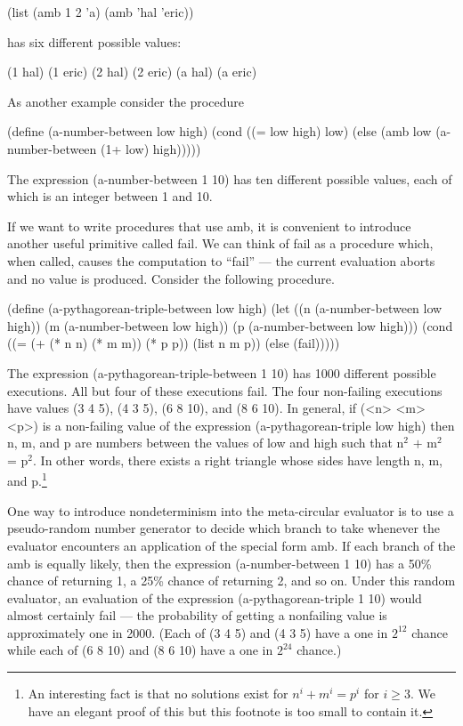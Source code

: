 \beginlisp
(list (amb 1 2 'a) (amb 'hal 'eric))
\endlisp

has six different possible values:

\beginlisp
(1 hal)
(1 eric)
(2 hal)
(2 eric)
(a hal)
(a eric)
\endlisp

As another example consider the procedure

\beginlisp
(define (a-number-between low high)
  (cond ((= low high) low)
        (else (amb low (a-number-between (1+ low) high)))))
\endlisp

The expression {\cf (a-number-between 1 10)}
has ten different possible values, each of which is an integer between
1 and 10.

If we want to write procedures that use {\cf amb}, it is convenient to
introduce another useful  
primitive called {\cf fail}.  We can think of {\cf fail} as a procedure
which, when called, causes the computation to ``fail'' --- the current
evaluation aborts and no value is produced.  Consider the following procedure.

\beginlisp
(define (a-pythagorean-triple-between low high)
  (let ((n (a-number-between low high))
        (m (a-number-between low high))
        (p (a-number-between low high)))
    (cond ((= (+ (* n n) (* m m)) (* p p))
           (list n m p))
          (else (fail)))))
\endlisp

The expression {\cf (a-pythagorean-triple-between 1 10)} has
1000 different possible executions.  All but four of these executions fail.
The four non-failing executions have values {\cf (3 4 5)}, {\cf (4 3 5)}, {\cf (6 8 10)},
and {\cf (8 6 10)}.  In general, if {\cf (<n> <m> <p>)} is a non-failing value
of the expression {\cf (a-pythagorean-triple low high)} then {\cf n},
{\cf m}, and {\cf p} are numbers between the values of {\cf low} and
{\cf high} such that
{\cf n}$^2$ $+$ {\cf m}$^2$ = {\cf p}$^2$.  In other words, there exists a
right triangle whose sides have length {\cf n}, {\cf m}, and {\cf
p}.\footnote{An interesting fact is that no solutions exist for $n^i +
m^i = p^i$ for $i \geq 3$.  We have an elegant proof of this but this
footnote is too small to contain it.}

One way to introduce nondeterminism into the meta-circular evaluator is
to use a pseudo-random number generator to decide which branch to take
whenever the evaluator encounters an 
application of the special form {\cf amb}.  If each branch of the {\cf amb}
is equally likely, then the expression {\cf (a-number-between 1 10)}
has a 50\% chance of returning 1, a 25\% chance of returning 2, and so on.
Under this random evaluator, an evaluation of the expression
{\cf (a-pythagorean-triple 1 10)} would almost certainly fail ---
the probability of getting a nonfailing value is approximately one in
2000. (Each of {\cf (3 4 5)} and {\cf (4 3 5)} have a one in $2^{12}$
chance while each of {\cf (6 8 10)} and {\cf (8 6 10)} have a
one in $2^{24}$ chance.)

